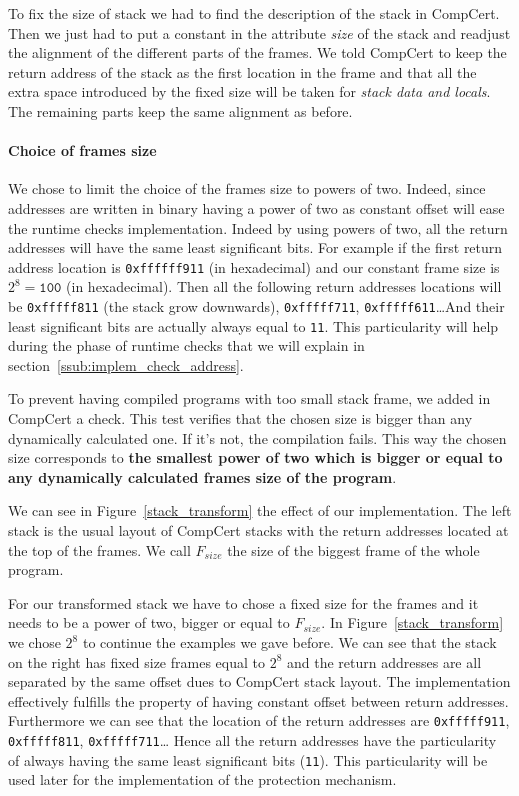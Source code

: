 \documentclass[11pt]{sdm}
\begin{document}
To fix the size of stack we had to find the description of the stack in CompCert. Then we just had to put a constant in the attribute \textit{size} of the stack and readjust the alignment of the different parts of the frames. We told CompCert to keep the return address of the stack as the first location in the frame and that all the extra space introduced by the fixed size will be taken for  \textit{stack data and locals}. The remaining parts keep the same alignment as before.

\paragraph{Choice of frames size}
\label{par:Choice of frames size}

We chose to limit the choice of the frames size to powers of two. Indeed, since addresses are written in binary having a power of two as constant offset will ease the runtime checks implementation. Indeed by using powers of two, all the return addresses will have the same least significant bits. For example if the first return address location is \texttt{0xffffff911} (in hexadecimal) and our constant frame size is $2^8 = \texttt{100}$ (in hexadecimal). Then all the following return addresses locations will be \texttt{0xfffff811} (the stack grow downwards), \texttt{0xfffff711}, \texttt{0xfffff611}\dots And their least significant bits are actually always equal to \texttt{11}. This particularity will help during the phase of runtime checks that we will explain in section~\ref{ssub:implem_check_address}.

To prevent having compiled programs with too small stack frame, we added in CompCert a check. This test verifies that the chosen size is bigger than any dynamically calculated one. If it's not, the compilation fails. This way the chosen size corresponds to \textbf{the smallest power of two which is bigger or equal to any dynamically calculated frames size of the program}.

We can see in Figure~\ref{stack_transform} the effect of our implementation. 
The left stack is the usual layout of CompCert stacks with the return addresses located at the top of the frames. We call $F_{size}$ the size of the biggest frame of the whole program.

For our transformed stack we have to chose a fixed size for the frames and it needs to be a power of two, bigger or equal to $F_{size}$. In Figure~\ref{stack_transform} we chose $2^8$ to continue the examples we gave before.
We can see that the stack on the right has fixed size frames equal to $2^8$ and the return addresses are all separated by the same offset dues to CompCert stack layout.
The implementation effectively fulfills the property of having constant offset between return addresses.
Furthermore we can see that the location of the return addresses are \texttt{0xfffff911}, \texttt{0xfffff811}, \texttt{0xfffff711}\dots
Hence all the return addresses have the particularity of always having the same least significant bits (\texttt{11}). This particularity will be used later for the implementation of the protection mechanism.
\end{document}
